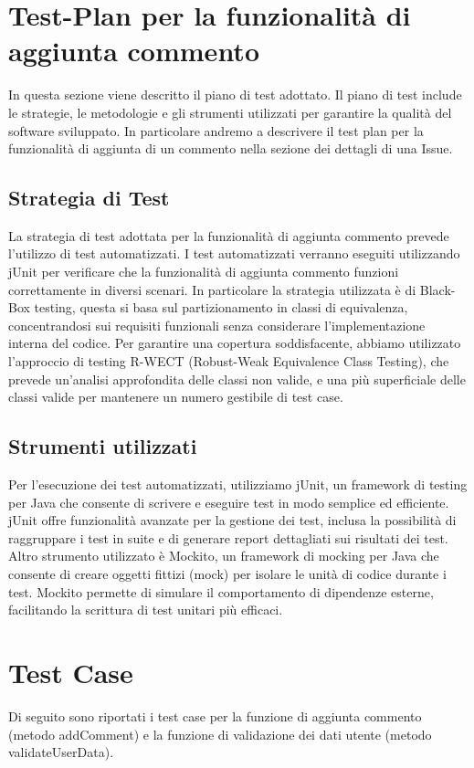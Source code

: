 \section{Test-Plan per la funzionalità di aggiunta commento}
In questa sezione viene descritto il piano di test adottato. Il piano di test include le 
strategie, le metodologie e gli strumenti utilizzati per 
garantire la qualità del software sviluppato.
In particolare andremo a descrivere il test plan per la funzionalità di aggiunta di un commento
nella sezione dei dettagli di una Issue.

\subsection{Strategia di Test}
La strategia di test adottata per la funzionalità di aggiunta commento prevede l'utilizzo di test 
automatizzati. I test automatizzati verranno eseguiti utilizzando jUnit per verificare che la funzionalità
di aggiunta commento funzioni correttamente in diversi scenari. In particolare la strategia utilizzata è di Black-Box 
testing, questa si basa sul partizionamento in classi di equivalenza, concentrandosi sui requisiti funzionali
senza considerare l'implementazione interna del codice. Per garantire una copertura soddisfacente, abbiamo utilizzato
l'approccio di testing R-WECT (Robust-Weak Equivalence Class Testing), che prevede un'analisi approfondita delle classi non valide, 
e una più superficiale delle classi valide per mantenere un numero gestibile di test case.

\subsection{Strumenti utilizzati}
Per l'esecuzione dei test automatizzati, utilizziamo jUnit, un framework di testing per Java che consente di scrivere e
eseguire test in modo semplice ed efficiente. jUnit offre funzionalità avanzate per la gestione dei test, 
inclusa la possibilità di raggruppare i test in suite e di generare report dettagliati sui risultati dei test.
Altro strumento utilizzato è Mockito, un framework di mocking per Java che consente di creare oggetti fittizi (mock) per isolare le unità di codice durante i test. 
Mockito permette di simulare il comportamento di dipendenze esterne, facilitando la scrittura di test unitari più efficaci.

\newpage

\section{Test Case}
Di seguito sono riportati i test case per la funzione di aggiunta commento (metodo addComment) e la funzione di validazione dei dati
utente (metodo validateUserData).

